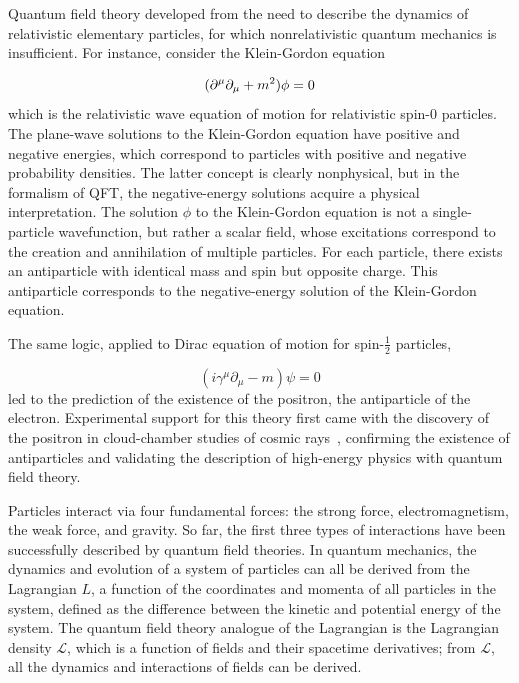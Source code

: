Quantum field theory developed from the need to describe the dynamics of relativistic elementary particles, for which nonrelativistic quantum mechanics is insufficient. For instance, consider the Klein-Gordon equation

\begin{equation}
(\partial^{\mu}\partial_{\mu} + m^{2})\phi = 0\newline
\label{eq:KG}
\end{equation}
which is the relativistic wave equation of motion for relativistic spin-0 particles. The plane-wave solutions to the Klein-Gordon equation have positive and negative energies, which correspond to particles with positive and negative probability densities. The latter concept is clearly nonphysical, but in the formalism of QFT, the negative-energy solutions acquire a physical interpretation\cite{PeskinSchroederPhysics,ThomsonPhysics}. The solution $\phi$ to the Klein-Gordon equation is not a single-particle wavefunction, but rather a scalar field, whose excitations correspond to the creation and annihilation of multiple particles. For each particle, there exists an antiparticle with identical mass and spin but opposite charge. This antiparticle corresponds to the negative-energy solution of the Klein-Gordon equation.

The same logic, applied to Dirac equation of motion for spin-$\frac{1}{2}$ particles,

\begin{equation}
(i\gamma^{\mu}\partial_{\mu} - m)\psi = 0
\label{eq:Dirac}
\end{equation}
led to the prediction of the existence of the positron, the antiparticle of the electron. Experimental support for this theory first came with the discovery of the positron in cloud-chamber studies of cosmic rays~\cite{BettiniPhysics}, confirming the existence of antiparticles and validating the description of high-energy physics with quantum field theory.

Particles interact via four fundamental forces: the strong force, electromagnetism, the weak force, and gravity. So far, the first three types of interactions have been successfully described by quantum field theories. In quantum mechanics, the dynamics and evolution of a system of particles can all be derived from the Lagrangian $L$, a function of the coordinates and momenta of all particles in the system, defined as the difference between the kinetic and potential energy of the system. The quantum field theory analogue of the Lagrangian is the Lagrangian density $\mathcal{L}$, which is a function of fields and their spacetime derivatives; from $\mathcal{L}$, all the dynamics and interactions of fields can be derived.

